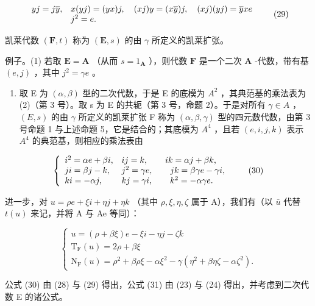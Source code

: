 \[
\begin{array}{r l} y j = j \overline {{y}}, & x (y j) = (y x) j, \quad (x j) y = (x \overline {{y}}) j, \quad (x j) (y j) = \overline {{y}} x e \\ & j ^ {2} = e. \end{array}\tag{29}
\]

凯莱代数 \((\mathbf{F}, t)\) 称为 \((\mathbf{E}, s)\) 的由 \(\gamma\) 所定义的凯莱扩张。

例子。(1) 若取 \(\mathbf{E} = \mathbf{A}\) （从而 \(s = 1_{\mathbf{A}}\) ），则代数 \(\mathbf{F}\) 是一个二次 \(\mathbf{A}\) -代数，带有基 \((e,j)\) ，其中 \(j^2 = \gamma e\) 。

\begin{enumerate}
\def\labelenumi{(\arabic{enumi})}
\setcounter{enumi}{1}
\tightlist
\item
  取 E 为 \((\alpha, \beta)\) 型的二次代数，于是 E 的底模为 \(A^{2}\) ，其典范基的乘法表为 (2)（第 3 号）。取 s 为 E 的共轭（第 3 号，命题 2）。于是对所有 \(\gamma \in A\) ， \((E, s)\) 的由 \(\gamma\) 所定义的凯莱扩张 F 称为 \((\alpha, \beta, \gamma)\) 型的四元数代数，由第 3 号命题 1 与上述命题 5，它是结合的；其底模为 \(A^{4}\) ，且若 \((e, i, j, k)\) 表示 \(A^{4}\) 的典范基，则相应的乘法表由
\end{enumerate}

\[
\left\{ \begin{array}{l l} i ^ {2} = \alpha e + \beta i, & i j = k, \qquad i k = \alpha j + \beta k, \\ j i = \beta j - k, & j ^ {2} = \gamma e, \qquad j k = \beta \gamma e - \gamma i, \\ k i = - \alpha j, & k j = \gamma i, \qquad k ^ {2} = - \alpha \gamma e. \end{array} \right.\tag{30}
\]

进一步，对 \(u = \rho e + \xi i + \eta j + \eta k\) （其中 \(\rho, \xi, \eta, \zeta\) 属于 A），我们有（以 \(\bar{u}\) 代替 \(t(u)\) 来记，并将 A 与 Ae 等同）：

\[
\left\{ \begin{array}{c} u = (\rho + \beta \xi) e - \xi i - \eta j - \zeta k \\ \mathrm{T} _ {\mathrm{F}} (u) = 2 \rho + \beta \xi \\ \mathrm{N} _ {\mathrm{F}} (u) = \rho^ {2} + \beta \rho \xi - \alpha \xi^ {2} - \gamma (\eta^ {2} + \beta \eta \zeta - \alpha \zeta^ {2}). \end{array} \right.\tag{31}
\]

公式 (30) 由 (28) 与 (29) 得出，公式 (31) 由 (23) 与 (24) 得出，并考虑到二次代数 E 的诸公式。

